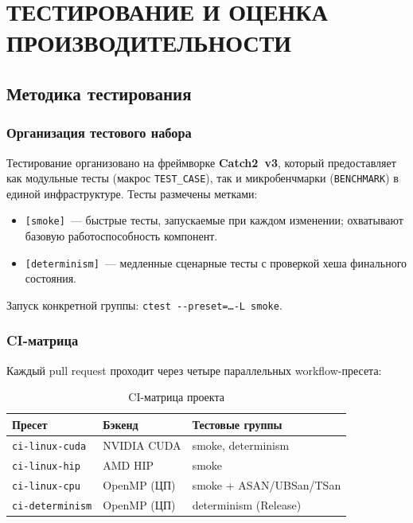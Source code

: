 \chapter{ТЕСТИРОВАНИЕ И ОЦЕНКА ПРОИЗВОДИТЕЛЬНОСТИ}

\section{Методика тестирования}

\subsection{Организация тестового набора}

Тестирование организовано на фреймворке \textbf{Catch2~v3}, который предоставляет
как модульные тесты (макрос \texttt{TEST\_CASE}), так и микробенчмарки
(\texttt{BENCHMARK}) в единой инфраструктуре.
Тесты размечены метками:
\begin{itemize}
  \item \texttt{[smoke]}~--- быстрые тесты, запускаемые при каждом изменении;
    охватывают базовую работоспособность компонент.
  \item \texttt{[determinism]}~--- медленные сценарные тесты с проверкой
    хеша финального состояния.
\end{itemize}

Запуск конкретной группы: \texttt{ctest -{}-preset=\ldots -L smoke}.

\subsection{CI-матрица}

Каждый pull request проходит через четыре параллельных workflow-пресета:

\begin{table}[h]
\centering
\caption{CI-матрица проекта}
\label{tab:ci_matrix}
\begin{tabular}{lll}
\toprule
\textbf{Пресет} & \textbf{Бэкенд} & \textbf{Тестовые группы} \\
\midrule
\texttt{ci-linux-cuda}    & NVIDIA CUDA  & smoke, determinism \\
\texttt{ci-linux-hip}     & AMD HIP      & smoke \\
\texttt{ci-linux-cpu}     & OpenMP (ЦП)   & smoke + ASAN/UBSan/TSan \\
\texttt{ci-determinism}   & OpenMP (ЦП)   & determinism (Release) \\
\bottomrule
\end{tabular}
\end{table}

